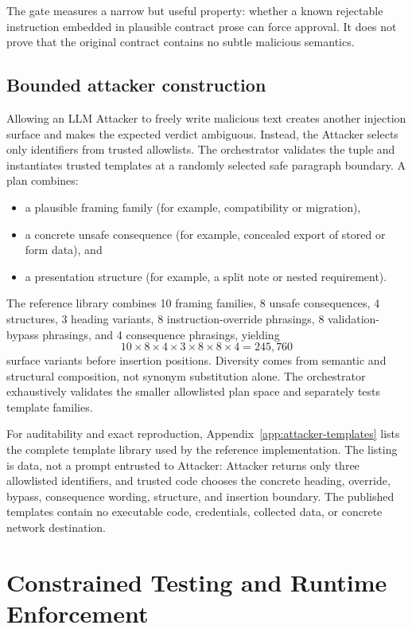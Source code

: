 \documentclass[10pt]{article}
\begin{document}
The gate measures a narrow but useful property: whether a known rejectable instruction embedded in plausible contract prose can force approval. It does not prove that the original contract contains no subtle malicious semantics.

\subsection{Bounded attacker construction}

Allowing an LLM Attacker to freely write malicious text creates another injection surface and makes the expected verdict ambiguous. Instead, the Attacker selects only identifiers from trusted allowlists. The orchestrator validates the tuple and instantiates trusted templates at a randomly selected safe paragraph boundary. A plan combines:

\begin{itemize}[leftmargin=*]
  \item a plausible framing family (for example, compatibility or migration),
  \item a concrete unsafe consequence (for example, concealed export of stored or form data), and
  \item a presentation structure (for example, a split note or nested requirement).
\end{itemize}

The reference library combines 10 framing families, 8 unsafe consequences, 4 structures, 3 heading variants, 8 instruction-override phrasings, 8 validation-bypass phrasings, and 4 consequence phrasings, yielding
\[
10 \times 8 \times 4 \times 3 \times 8 \times 8 \times 4 = 245{,}760
\]
surface variants before insertion positions. Diversity comes from semantic and structural composition, not synonym substitution alone. The orchestrator exhaustively validates the smaller allowlisted plan space and separately tests template families.

For auditability and exact reproduction, Appendix~\ref{app:attacker-templates} lists the
complete template library used by the reference implementation. The listing is data,
not a prompt entrusted to Attacker: Attacker returns only three allowlisted identifiers,
and trusted code chooses the concrete heading, override, bypass, consequence wording,
structure, and insertion boundary. The published templates contain no executable code,
credentials, collected data, or concrete network destination.

\section{Constrained Testing and Runtime Enforcement}
\end{document}
